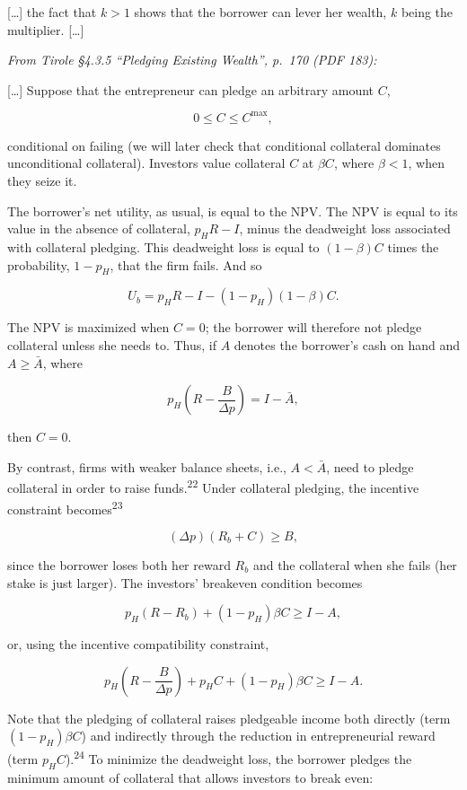 \documentclass[11pt,a4paper]{article}
\begin{document}
{[}\ldots{]} the fact that \(k > 1\) shows that the borrower can lever her wealth, \(k\) being the
multiplier. {[}\ldots{]}

\emph{From Tirole §4.3.5 ``Pledging Existing Wealth'', p.~170 (PDF 183):}

{[}\ldots{]} Suppose that the entrepreneur can pledge an arbitrary amount \(C\),

\[0 \leqslant C \leqslant C^{\max},\]

conditional on failing (we will later check that conditional collateral dominates unconditional
collateral). Investors value collateral \(C\) at \(\beta C\), where \(\beta < 1\), when they seize
it.

The borrower's net utility, as usual, is equal to the NPV. The NPV is equal to its value in the
absence of collateral, \(p_H R - I\), minus the deadweight loss associated with collateral pledging.
This deadweight loss is equal to \((1 - \beta)C\) times the probability, \(1 - p_H\), that the firm
fails. And so

\[U_b = p_H R - I - (1 - p_H)(1 - \beta)C.\]

The NPV is maximized when \(C = 0\); the borrower will therefore not pledge collateral unless she
needs to. Thus, if \(A\) denotes the borrower's cash on hand and \(A \geqslant \bar A\), where

\[p_H\left(R - \frac{B}{\Delta p}\right) = I - \bar A,\]

then \(C = 0\).

By contrast, firms with weaker balance sheets, i.e., \(A < \bar A\), need to pledge collateral in
order to raise funds.\textsuperscript{22} Under collateral pledging, the incentive constraint
becomes\textsuperscript{23}

\[(\Delta p)(R_b + C) \geqslant B,\]

since the borrower loses both her reward \(R_b\) and the collateral when she fails (her stake is
just larger). The investors' breakeven condition becomes

\[p_H(R - R_b) + (1 - p_H)\beta C \geqslant I - A,\]

or, using the incentive compatibility constraint,

\[p_H\left(R - \frac{B}{\Delta p}\right) + p_H C + (1 - p_H)\beta C \geqslant I - A.\]

Note that the pledging of collateral raises pledgeable income both directly (term
\((1 - p_H)\beta C\)) and indirectly through the reduction in entrepreneurial reward (term
\(p_H C\)).\textsuperscript{24} To minimize the deadweight loss, the borrower pledges the minimum
amount of collateral that allows investors to break even:
\end{document}

